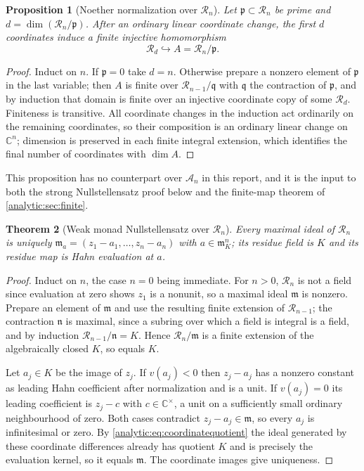 \documentclass[11pt,letterpaper]{article}
\newtheorem{theorem}{Theorem}[section]
\newtheorem{proposition}[theorem]{Proposition}
\theoremstyle{definition}
\theoremstyle{remark}
\newcommand{\C}{\mathbb C}
\newcommand{\A}{\mathscr A}
\newcommand{\RR}{\mathscr R}
\newcommand{\m}{\mathfrak m}
\newcommand{\pp}{\mathfrak p}
\numberwithin{equation}{section}
\begin{document}
\begin{proposition}[Noether normalization over $\RR_n$]
\label{analytic:prop:normalization}
Let $\pp\subset\RR_n$ be prime and $d=\dim(\RR_n/\pp)$. After an ordinary
linear coordinate change, the first $d$ coordinates induce a finite
injective homomorphism
\begin{equation}\label{analytic:eq:normalization}
 \RR_d\hookrightarrow A=\RR_n/\pp .
\end{equation}
\end{proposition}
\begin{proof}
Induct on $n$. If $\pp=0$ take $d=n$. Otherwise prepare a nonzero element of
$\pp$ in the last variable; then $A$ is finite over $\RR_{n-1}/\mathfrak q$
with $\mathfrak q$ the contraction of $\pp$, and by induction that domain is
finite over an injective coordinate copy of some $\RR_d$. Finiteness is
transitive. All coordinate changes in the induction act ordinarily on the
remaining coordinates, so their composition is an ordinary linear change on
$\C^n$; dimension is preserved in each finite integral extension, which
identifies the final number of coordinates with $\dim A$.
\end{proof}

This proposition has no counterpart over $\A_n$ in this report, and it is
the input to both the strong Nullstellensatz proof below and the finite-map
theorem of \cref{analytic:sec:finite}.

\begin{theorem}[Weak monad Nullstellensatz over $\RR_n$]
\label{analytic:thm:weaknullR}
Every maximal ideal of $\RR_n$ is uniquely
$\m_a=(z_1-a_1,\ldots,z_n-a_n)$ with $a\in\m_K^n$; its residue field is $K$
and its residue map is Hahn evaluation at $a$.
\end{theorem}
\begin{proof}
Induct on $n$, the case $n=0$ being immediate. For $n>0$, $\RR_n$ is not a
field since evaluation at zero shows $z_1$ is a nonunit, so a maximal ideal
$\m$ is nonzero. Prepare an element of $\m$ and use the resulting finite
extension of $\RR_{n-1}$; the contraction $\mathfrak n$ is maximal, since a
subring over which a field is integral is a field, and by induction
$\RR_{n-1}/\mathfrak n=K$. Hence $\RR_n/\m$ is a finite extension of the
algebraically closed $K$, so equals $K$.

Let $a_j\in K$ be the image of $z_j$. If $v(a_j)<0$ then $z_j-a_j$ has a
nonzero constant as leading Hahn coefficient after normalization and is a
unit. If $v(a_j)=0$ its leading coefficient is $z_j-c$ with $c\in\C^\times$,
a unit on a sufficiently small ordinary neighbourhood of zero. Both cases
contradict $z_j-a_j\in\m$, so every $a_j$ is infinitesimal or zero. By
\eqref{analytic:eq:coordinatequotient} the ideal generated by these
coordinate differences already has quotient $K$ and is precisely the
evaluation kernel, so it equals $\m$. The coordinate images give
uniqueness.
\end{proof}
\end{document}
